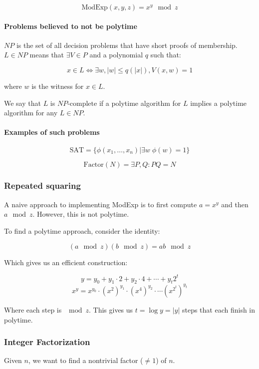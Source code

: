 \documentclass{idc_msc}
\begin{document}
\[\textrm{ModExp}(x,y,z) = x^y \mod z\]

\paragraph{Problems believed to not be polytime}

\(\textit{NP}\) is the set of all decision problems that have short proofs of membership.
\(L \in \textit{NP}\) means that \(\exists V \in P\) and a polynomial \(q\) such that:

\[x \in L \Leftrightarrow \exists w, |w| \le q(|x|), V(x, w) = 1\]

where \(w\) is the witness for \(x \in L\).

We say that \(L\) is \(\textit{NP}\textrm{-complete}\) if a polytime algorithm for \(L\) implies a polytime algorithm for any \(L \in \textit{NP}\).

\paragraph{Examples of such problems}

\[\textrm{SAT} = \{\phi(x_1, \ldots, x_n) | \exists w \; \phi(w) = 1\}\]

\[\textrm{Factor}(N) = \exists P, Q : PQ = N\]

\subsubsection{Repeated squaring}

A naive approach to implementing ModExp is to first compute \(a=x^y\) and then \(a \mod z\).
However, this is not polytime.

To find a polytime approach, consider the identity:

\[(a \mod z) (b \mod z) = ab \mod z\]

Which gives us an efficient construction:

\[y = y_0 + y_1 \cdot 2 + y_2 \cdot 4 + \cdots + y_t 2^t\]
\[x^y = x^{y_0} \cdot (x^2)^{y_1} \cdot (x^4)^{y_2} \cdot \cdots (x^{2^t})^{y_t} \]

Where each step is \(\mod z\). This gives us \(t=\log y=|y|\) steps that each finish in polytime.

\subsubsection{Integer Factorization}

Given \(n\), we want to find a nontrivial factor (\(\ne 1\)) of \(n\).
\end{document}
